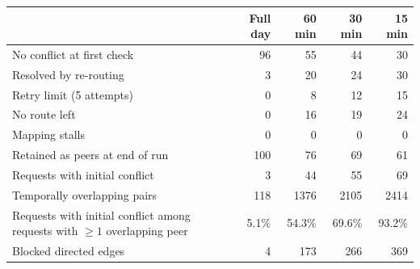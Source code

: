 \begin{tabular}{lrrrr}
  \toprule
  & Full day & 60 min & 30 min & 15 min \\
  \midrule
  No conflict at first check & 96 & 55 & 44 & 30 \\
  Resolved by re-routing & 3 & 20 & 24 & 30 \\
  Retry limit (5 attempts) & 0 & 8 & 12 & 15 \\
  No route left & 0 & 16 & 19 & 24 \\
  Mapping stalls & 0 & 0 & 0 & 0 \\
  Retained as peers at end of run & 100 & 76 & 69 & 61 \\
  Requests with initial conflict & 3 & 44 & 55 & 69 \\
  Temporally overlapping pairs & 118 & 1376 & 2105 & 2414 \\
  \makecell[l]{Requests with initial conflict among\\requests with ${\ge}1$ overlapping peer} & 5.1\% & 54.3\% & 69.6\% & 93.2\% \\
  Blocked directed edges & 4 & 173 & 266 & 369 \\
  \bottomrule
\end{tabular}
